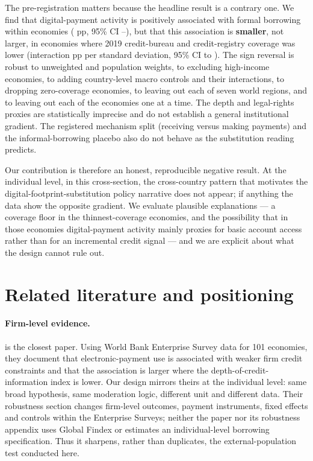 The pre-registration matters because the headline result is a contrary one. We find that
digital-payment activity is positively associated with formal borrowing within economies
(\MOneBeta{} pp, 95\% CI \MOneCIlo{}--\MOneCIhi{}), but that this association is
\textbf{smaller}, not larger, in economies where 2019 credit-bureau and credit-registry
coverage was lower (interaction \MTwoBetaThree{} pp per standard deviation, 95\% CI
\MTwoBetaThreeCIlo{} to \MTwoBetaThreeCIhi{}). The sign reversal is robust to unweighted and
population weights, to excluding high-income economies, to adding country-level macro
controls and their interactions, to dropping zero-coverage economies, to leaving out each of
seven world regions, and to leaving out each of the \NEconomies{} economies one at a time.
The depth and legal-rights proxies are statistically imprecise and do not establish a
general institutional gradient. The registered mechanism split (receiving versus making
payments) and the informal-borrowing placebo also do not behave as the substitution reading
predicts.

Our contribution is therefore an honest, reproducible negative result. At the individual
level, in this cross-section, the cross-country pattern that motivates the
digital-footprint-substitution policy narrative does not appear; if anything the data show
the opposite gradient. We evaluate plausible explanations --- a coverage floor in the
thinnest-coverage economies, and the possibility that in those economies digital-payment
activity mainly proxies for basic account access rather than for an incremental credit
signal --- and we are explicit about what the design cannot rule out.

\section{Related literature and positioning}

\paragraph{Firm-level evidence.} \citet{GalileaFaraziMare2026} is the closest paper. Using
World Bank Enterprise Survey data for 101 economies, they document that electronic-payment
use is associated with weaker firm credit constraints and that the association is larger
where the depth-of-credit-information index is lower. Our design mirrors theirs at the
individual level: same broad hypothesis, same moderation logic, different unit and different
data. Their robustness section changes firm-level outcomes, payment instruments, fixed
effects and controls within the Enterprise Surveys; neither the paper nor its robustness
appendix uses Global Findex or estimates an individual-level borrowing specification. Thus
it sharpens, rather than duplicates, the external-population test conducted here.

